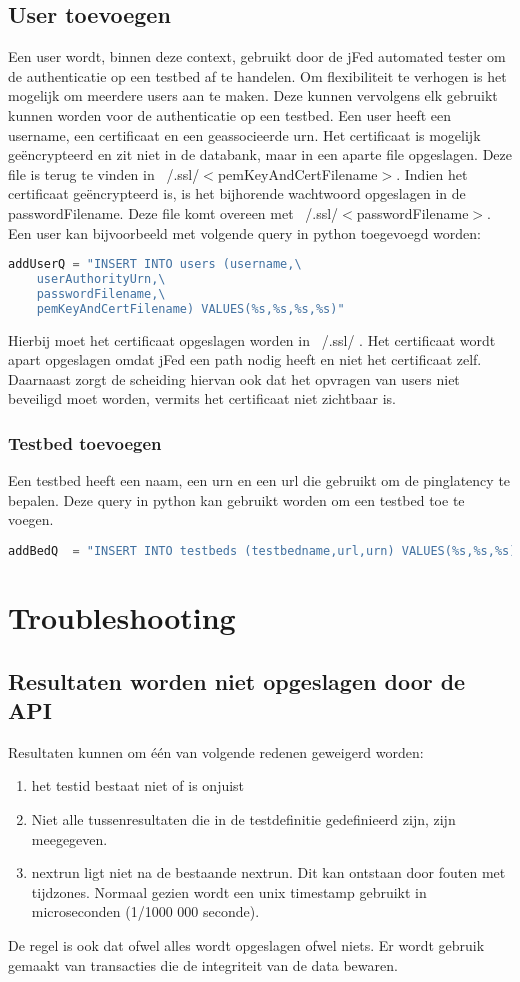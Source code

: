 \subsection{User toevoegen}
\npar
Een user wordt, binnen deze context, gebruikt door de jFed automated tester om de authenticatie op een testbed af te handelen. Om flexibiliteit te verhogen is het mogelijk om meerdere users aan te maken. Deze kunnen vervolgens elk gebruikt kunnen worden voor de authenticatie op een testbed.
\npar
Een user heeft een username, een certificaat en een geassocieerde urn. Het certificaat is mogelijk ge\"encrypteerd en zit niet in de databank, maar in een aparte file opgeslagen. Deze file is terug te vinden in ~/.ssl/$<$pemKeyAndCertFilename$>$. Indien het certificaat ge\"encrypteerd is, is het bijhorende wachtwoord opgeslagen in de passwordFilename. Deze file komt overeen met ~/.ssl/$<$passwordFilename$>$.
\clearpage
\npar
Een user kan bijvoorbeeld met volgende query in python toegevoegd worden:
\begin{lstlisting}[language=Python]
addUserQ = "INSERT INTO users (username,\
	userAuthorityUrn,\
	passwordFilename,\
	pemKeyAndCertFilename) VALUES(%s,%s,%s,%s)"
\end{lstlisting}
\npar
Hierbij moet het certificaat opgeslagen worden in ~/.ssl/ . Het certificaat wordt apart opgeslagen omdat jFed een path nodig heeft en niet het certificaat zelf. Daarnaast zorgt de scheiding hiervan ook dat het opvragen van users niet beveiligd moet worden, vermits het certificaat niet zichtbaar is.

\subsubsection{Testbed toevoegen}
\npar
Een testbed heeft een naam, een urn en een url die gebruikt om de pinglatency te bepalen.
Deze query in python kan gebruikt worden om een testbed toe te voegen.
\begin{lstlisting}[language=Python]
addBedQ  = "INSERT INTO testbeds (testbedname,url,urn) VALUES(%s,%s,%s)"
\end{lstlisting}
 
\section{Troubleshooting}
\subsection{Resultaten worden niet opgeslagen door de API}
\npar
Resultaten kunnen om \'e\'en van volgende redenen geweigerd worden:
\begin{enumerate}
\item het testid bestaat niet of is onjuist
\item Niet alle tussenresultaten die in de testdefinitie gedefinieerd zijn, zijn meegegeven. 
\item nextrun ligt niet na de bestaande nextrun. Dit kan ontstaan door fouten met tijdzones. Normaal gezien wordt een unix timestamp gebruikt in microseconden (1/1000 000 seconde).
\end{enumerate}
De regel is ook dat ofwel alles wordt opgeslagen ofwel niets. Er wordt gebruik gemaakt van transacties die de integriteit van de data bewaren.
